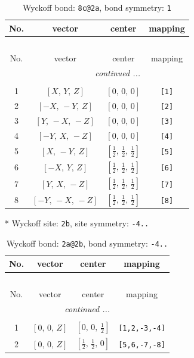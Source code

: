 \documentclass[fleqn,8pt]{jsarticle}
\begin{document}
\renewcommand{\arraystretch}{1.2}
\begin{longtable}{cccc}
\caption{Wyckoff bond: {\tt 8c@2a}, bond symmetry: {\tt 1}}
 \\
 \hline \hline
No. & vector & center & mapping \\ \hline \endfirsthead

\multicolumn{3}{l}{\tablename\ \thetable{}} \\
 \hline \hline
No. & vector & center & mapping \\ \hline \endhead

 \hline \hline
\multicolumn{3}{r}{\footnotesize\it continued ...} \\ \endfoot

 \hline \hline
\multicolumn{3}{r}{} \\ \endlastfoot

1 & $\left[ X,\, Y,\, Z \right]$ & $\left[ 0,\, 0,\, 0 \right]$ & {\tt [1]} \\ \hline
2 & $\left[ - X,\, - Y,\, Z \right]$ & $\left[ 0,\, 0,\, 0 \right]$ & {\tt [2]} \\ \hline
3 & $\left[ Y,\, - X,\, - Z \right]$ & $\left[ 0,\, 0,\, 0 \right]$ & {\tt [3]} \\ \hline
4 & $\left[ - Y,\, X,\, - Z \right]$ & $\left[ 0,\, 0,\, 0 \right]$ & {\tt [4]} \\ \hline
5 & $\left[ X,\, - Y,\, Z \right]$ & $\left[ \frac{1}{2},\, \frac{1}{2},\, \frac{1}{2} \right]$ & {\tt [5]} \\ \hline
6 & $\left[ - X,\, Y,\, Z \right]$ & $\left[ \frac{1}{2},\, \frac{1}{2},\, \frac{1}{2} \right]$ & {\tt [6]} \\ \hline
7 & $\left[ Y,\, X,\, - Z \right]$ & $\left[ \frac{1}{2},\, \frac{1}{2},\, \frac{1}{2} \right]$ & {\tt [7]} \\ \hline
8 & $\left[ - Y,\, - X,\, - Z \right]$ & $\left[ \frac{1}{2},\, \frac{1}{2},\, \frac{1}{2} \right]$ & {\tt [8]} \\
\end{longtable}
* Wyckoff site: {\tt 2b}, site symmetry: {\tt -4..}
\renewcommand{\arraystretch}{1.2}
\begin{longtable}{cccc}
\caption{Wyckoff bond: {\tt 2a@2b}, bond symmetry: {\tt -4..}}
 \\
 \hline \hline
No. & vector & center & mapping \\ \hline \endfirsthead

\multicolumn{3}{l}{\tablename\ \thetable{}} \\
 \hline \hline
No. & vector & center & mapping \\ \hline \endhead

 \hline \hline
\multicolumn{3}{r}{\footnotesize\it continued ...} \\ \endfoot

 \hline \hline
\multicolumn{3}{r}{} \\ \endlastfoot

1 & $\left[ 0,\, 0,\, Z \right]$ & $\left[ 0,\, 0,\, \frac{1}{2} \right]$ & {\tt [1,2,-3,-4]} \\ \hline
2 & $\left[ 0,\, 0,\, Z \right]$ & $\left[ \frac{1}{2},\, \frac{1}{2},\, 0 \right]$ & {\tt [5,6,-7,-8]} \\
\end{longtable}
\end{document}
